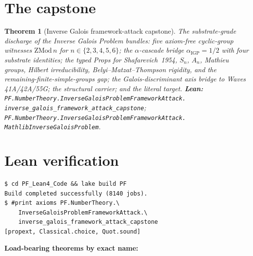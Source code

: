 \documentclass[11pt,a4paper]{article}
\theoremstyle{plain}
\newtheorem{theorem}{Theorem}[section]
\theoremstyle{definition}
\begin{document}
\section{The capstone}
\label{sec:capstone}

\begin{theorem}[Inverse Galois framework-attack capstone]
\label{thm:capstone}
The substrate-grade discharge of the Inverse Galois Problem bundles:
five axiom-free cyclic-group witnesses
$\mathrm{ZMod}\,n$ for $n \in \{2,3,4,5,6\}$; the $\alpha$-cascade
bridge $\alpha_{\mathrm{IGP}} = 1/2$ with four substrate identities;
the typed Props for Shafarevich~1954, $S_{n}$, $A_{n}$, Mathieu groups,
Hilbert irreducibility, Belyi--Matzat--Thompson rigidity, and the
remaining-finite-simple-groups gap; the Galois-discriminant axis bridge
to Waves 41A/42A/55G; the structural carrier; and the literal target.
\textbf{Lean:}
\texttt{PF.NumberTheory.InverseGaloisProblemFrameworkAttack.\\
inverse\_galois\_framework\_attack\_capstone};
\texttt{PF.NumberTheory.InverseGaloisProblemFrameworkAttack.\\
MathlibInverseGaloisProblem}.
\end{theorem}

\section{Lean verification}
\label{sec:lean}

\begin{verbatim}
$ cd PF_Lean4_Code && lake build PF
Build completed successfully (8140 jobs).
$ #print axioms PF.NumberTheory.\
    InverseGaloisProblemFrameworkAttack.\
    inverse_galois_framework_attack_capstone
[propext, Classical.choice, Quot.sound]
\end{verbatim}

\noindent\textbf{Load-bearing theorems by exact name:}
\end{document}
